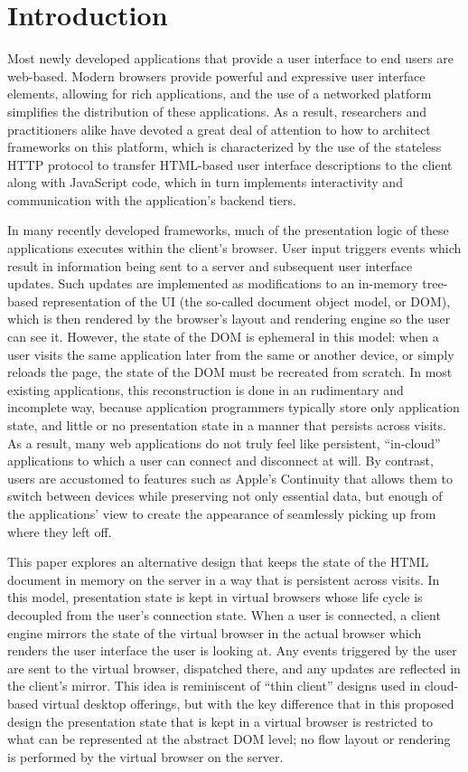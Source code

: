 %
%
\section{Introduction}
\label{sec:intro}

Most newly developed applications that provide a user interface to end users 
are web-based.  Modern browsers provide powerful and expressive user interface 
elements, allowing for rich applications, and the use of a networked
platform simplifies the distribution of these applications.  As a result,
researchers and practitioners alike have devoted a great deal of attention to
how to architect frameworks on this platform, which is characterized by the
use of the stateless HTTP protocol to transfer HTML-based user interface 
descriptions to the client along with JavaScript code, which in turn 
implements interactivity and communication with the application's backend tiers.

In many recently developed frameworks, much of the presentation logic of these applications
executes within the client's browser.  User input triggers events
which result in information being sent to a server and subsequent user interface updates.
Such updates are implemented as modifications to an in-memory tree-based
representation of the UI (the so-called document object model, or DOM), which
is then rendered by the browser's layout and rendering engine so the user can see it.
However, the state of the DOM is ephemeral in this model: when a user visits 
the same application later from the same or another device, or simply reloads the page, the state of the
DOM must be recreated from scratch.  In most existing applications, this 
reconstruction is done in an rudimentary and incomplete way, because
application programmers typically store only application state, and little 
or no presentation state in a manner that persists across visits.
As a result, many web applications do not truly feel like persistent,
``in-cloud'' applications to which a user can connect and disconnect at will.
By contrast, users are accustomed to features such as Apple's Continuity\cite{apple-continuity}
that allows them to switch between devices while preserving not only 
essential data, but enough of the applications' view to create the appearance
of seamlessly picking up from where they left off.

This paper explores an alternative design that keeps the state 
of the HTML document in memory on the server in a way that is persistent across visits.
In this model, presentation state is kept in virtual browsers whose life
cycle is decoupled from the user's connection state.  When a user is connected,
a client engine mirrors the state of the virtual browser in the actual browser which
renders the user interface the user is looking at.  Any events triggered by the
user are sent to the virtual browser, dispatched there, and any updates
are reflected in the client's mirror.  This idea is reminiscent of 
``thin client'' designs used in cloud-based virtual desktop offerings,
but with the key difference that in this proposed design the presentation state
that is kept in a virtual browser is restricted to what can be represented at the
abstract DOM level; no flow layout or rendering is performed by the virtual browser on the 
server.

